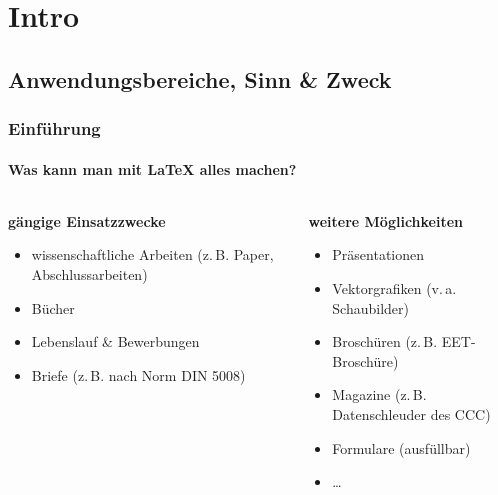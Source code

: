 \section{Intro}

\subsection{Anwendungsbereiche, Sinn \& Zweck}
\begin{frame}[t]
    \frametitle{Einführung}
    \framesubtitle{Was kann man mit LaTeX alles machen?}

    \begin{columns}[t]
        \begin{column}{.5\textwidth}
            \textbf{gängige Einsatzzwecke}\\[3mm]
            \begin{itemize}
                \item wissenschaftliche Arbeiten (z.\,B. Paper, Abschlussarbeiten)
                \item Bücher
                \item Lebenslauf \& Bewerbungen
                \item Briefe (z.\,B. nach Norm DIN 5008)
            \end{itemize}
        \end{column}
        \begin{column}{.5\textwidth}
            \textbf{weitere Möglichkeiten}\\[3mm]
            \begin{itemize}
                \item Präsentationen
                \item Vektorgrafiken (v.\,a. Schaubilder)
                \item Broschüren (z.\,B. EET-Broschüre)
                \item Magazine (z.\,B. Datenschleuder des CCC)
                \item Formulare (ausfüllbar)
                \item \ldots
            \end{itemize}
        \end{column}
    \end{columns}
\end{frame}



